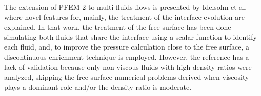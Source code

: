 
The extension of PFEM-2 to multi-fluids flows is presented by Idelsohn et al. \cite{Idelsohn13c} where novel features for, mainly, the treatment of the interface evolution are explained. In that work, the treatment of the free-surface has been done simulating both fluids that share the interface using a scalar function to identify each fluid, and, to improve the pressure calculation close to the free surface, a discontinuous enrichment technique is employed. However, the reference has a lack of validation because only non-viscous fluids with high density ratios were analyzed, skipping the free surface numerical problems derived when viscosity plays a dominant role and/or the density ratio is moderate.

